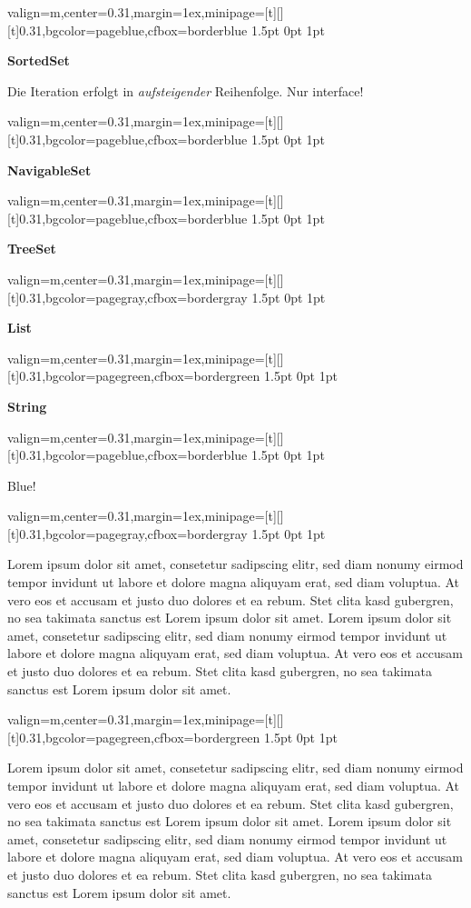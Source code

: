 \documentclass[11pt, a4paper, landscape]{article}
\newcommand{\fancyheader}[1]{
	\centerline{\sffamily \textbf{ \large #1}}
}
\newenvironment{fancybox}[2]
{
	\begin{adjustbox}{valign=m,center=0.31\textwidth,margin=1ex,minipage=[t][][t]{0.31\textwidth},bgcolor=#1,cfbox=#2 1.5pt 0pt 1pt}
	\begin{centering}
}
{
	\end{centering}
	\end{adjustbox}
}
\begin{document}
\begin{multicols}{3}
\begin{fancybox}{pageblue}{borderblue}
\fancyheader{SortedSet}


\raggedright{
	Die Iteration erfolgt in \emph{aufsteigender} Reihenfolge. Nur interface!
}
\end{fancybox}

\begin{fancybox}{pageblue}{borderblue}
\fancyheader{NavigableSet}

\end{fancybox}

\begin{fancybox}{pageblue}{borderblue}
\fancyheader{TreeSet}

\end{fancybox}

\begin{fancybox}{pagegray}{bordergray}
\fancyheader{List}

\end{fancybox}

\begin{fancybox}{pagegreen}{bordergreen}
\fancyheader{String}

\end{fancybox}

\begin{fancybox}{pageblue}{borderblue}
	Blue!
\end{fancybox}


\begin{fancybox}{pagegray}{bordergray}
Lorem ipsum dolor sit amet, consetetur sadipscing elitr, sed diam nonumy eirmod tempor invidunt ut labore et dolore magna aliquyam erat, sed diam voluptua. At vero eos et accusam et justo duo dolores et ea rebum. Stet clita kasd gubergren, no sea takimata sanctus est Lorem ipsum dolor sit amet. Lorem ipsum dolor sit amet, consetetur sadipscing elitr, sed diam nonumy eirmod tempor invidunt ut labore et dolore magna aliquyam erat, sed diam voluptua. At vero eos et accusam et justo duo dolores et ea rebum. Stet clita kasd gubergren, no sea takimata sanctus est Lorem ipsum dolor sit amet.
\end{fancybox}

\begin{fancybox}{pagegreen}{bordergreen}
Lorem ipsum dolor sit amet, consetetur sadipscing elitr, sed diam nonumy eirmod tempor invidunt ut labore et dolore magna aliquyam erat, sed diam voluptua. At vero eos et accusam et justo duo dolores et ea rebum. Stet clita kasd gubergren, no sea takimata sanctus est Lorem ipsum dolor sit amet. Lorem ipsum dolor sit amet, consetetur sadipscing elitr, sed diam nonumy eirmod tempor invidunt ut labore et dolore magna aliquyam erat, sed diam voluptua. At vero eos et accusam et justo duo dolores et ea rebum. Stet clita kasd gubergren, no sea takimata sanctus est Lorem ipsum dolor sit amet.
\end{fancybox}


\end{multicols}
\end{document}
